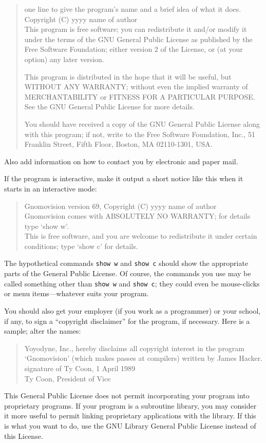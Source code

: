 \documentclass[a4paper,11pt,oneside]{book}
\begin{document}
\begin{quote}
	one line to give the program's name and a brief idea of what it does. \\
	Copyright (C) yyyy  name of author \\

	This program is free software; you can redistribute it and/or modify
	it under the terms of the GNU General Public License as published by
	the Free Software Foundation; either version 2 of the License, or
	(at your option) any later version.

	This program is distributed in the hope that it will be useful,
	but WITHOUT ANY WARRANTY; without even the implied warranty of
	MERCHANTABILITY or FITNESS FOR A PARTICULAR PURPOSE.  See the
	GNU General Public License for more details.

	You should have received a copy of the GNU General Public License
	along with this program; if not, write to the Free Software
	Foundation, Inc., 51 Franklin Street, Fifth Floor, Boston, MA  02110-1301, USA.
\end{quote}

Also add information on how to contact you by electronic and paper mail.

If the program is interactive, make it output a short notice like this
when it starts in an interactive mode:

\begin{quote}
	Gnomovision version 69, Copyright (C) yyyy  name of author \\
	Gnomovision comes with ABSOLUTELY NO WARRANTY; for details type `show w'. \\
	This is free software, and you are welcome to redistribute it
	under certain conditions; type `show c' for details.
\end{quote}


The hypothetical commands {\tt show w} and {\tt show c} should show the
appropriate parts of the General Public License.  Of course, the commands
you use may be called something other than {\tt show w} and {\tt show c};
they could even be mouse-clicks or menu items---whatever suits your
program.

You should also get your employer (if you work as a programmer) or your
school, if any, to sign a ``copyright disclaimer'' for the program, if
necessary.  Here is a sample; alter the names:

\begin{quote}
	Yoyodyne, Inc., hereby disclaims all copyright interest in the program \\
	`Gnomovision' (which makes passes at compilers) written by James Hacker. \\

	signature of Ty Coon, 1 April 1989 \\
	Ty Coon, President of Vice
\end{quote}


This General Public License does not permit incorporating your program
into proprietary programs.  If your program is a subroutine library, you
may consider it more useful to permit linking proprietary applications
with the library.  If this is what you want to do, use the GNU Library
General Public License instead of this License.
\end{document}
